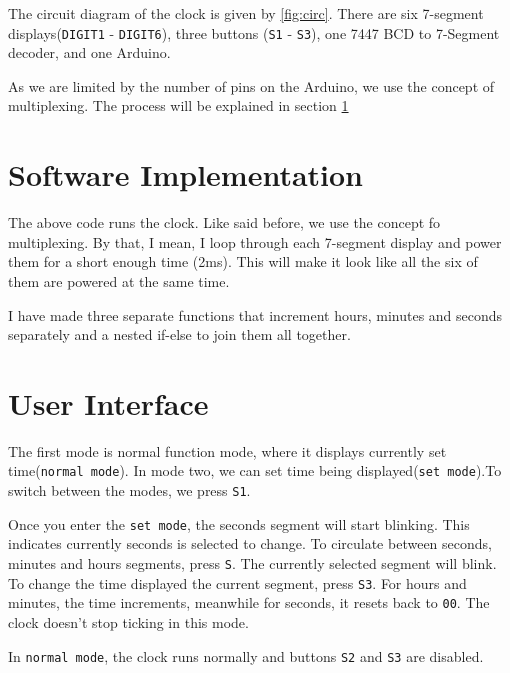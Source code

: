 \documentclass[journal]{IEEEtran}
\begin{document}
The circuit diagram of the clock is given by \ref{fig:circ}. There are six 7-segment displays(\texttt{DIGIT1} - \texttt{DIGIT6}), three buttons (\texttt{S1} - \texttt{S3}), one 7447 BCD to 7-Segment decoder, and one Arduino.

As we are limited by the number of pins on the Arduino, we use the concept of multiplexing. The process will be explained in section \ref{section:sft}

\section{Software Implementation}\label{section:sft}



The above code runs the clock. Like said before, we use the concept fo multiplexing. By that, I mean, I loop through each 7-segment display and power them for a short enough time (2ms). This will make it look like all the six of them are powered at the same time.

I have made three separate functions that increment hours, minutes and seconds separately and a nested if-else to join them all together. 

\section{User Interface}

The first mode is normal function mode, where it displays currently set time(\texttt{normal mode}). In mode two, we can set time being displayed(\texttt{set mode}).To switch between the modes, we press \texttt{S1}. 

Once you enter the \texttt{set mode}, the seconds segment will start blinking. This indicates currently seconds is selected to change. To circulate between seconds, minutes and hours segments, press \texttt{S}. The currently selected segment will blink. To change the time displayed the current segment, press \texttt{S3}. For hours and minutes, the time increments, meanwhile for seconds, it resets back to \texttt{00}. The clock doesn't stop ticking in this mode.

In \texttt{normal mode}, the clock runs normally and buttons \texttt{S2} and \texttt{S3} are disabled.
\end{document}
